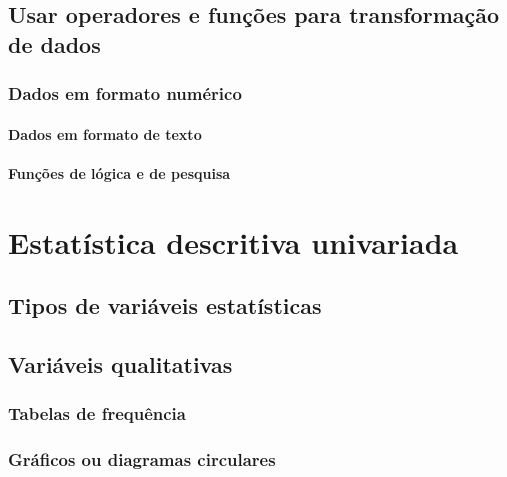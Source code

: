 \documentclass[
  letterpaper,
  DIV=11,
  numbers=noendperiod]{scrreprt}
\begin{document}
\chapter{\texorpdfstring{\textbf{Usar operadores e funções para
transformação de
dados}}{Usar operadores e funções para transformação de dados}}\label{usar-operadores-e-funuxe7uxf5es-para-transformauxe7uxe3o-de-dados}

\section{\texorpdfstring{\textbf{Dados em formato
numérico}}{Dados em formato numérico}}\label{dados-em-formato-numuxe9rico}

\subsection{\texorpdfstring{\textbf{Dados em formato de
texto}}{Dados em formato de texto}}\label{dados-em-formato-de-texto}

\subsection{\texorpdfstring{\textbf{Funções de lógica e de
pesquisa}}{Funções de lógica e de pesquisa}}\label{funuxe7uxf5es-de-luxf3gica-e-de-pesquisa}

\part{Estatística descritiva univariada}

\chapter{\texorpdfstring{\textbf{Tipos de variáveis
estatísticas}}{Tipos de variáveis estatísticas}}\label{tipos-de-variuxe1veis-estatuxedsticas}

\chapter{Variáveis qualitativas}\label{variuxe1veis-qualitativas}

\section{Tabelas de frequência}\label{tabelas-de-frequuxeancia}

\section{Gráficos ou diagramas
circulares}\label{gruxe1ficos-ou-diagramas-circulares}
\end{document}
